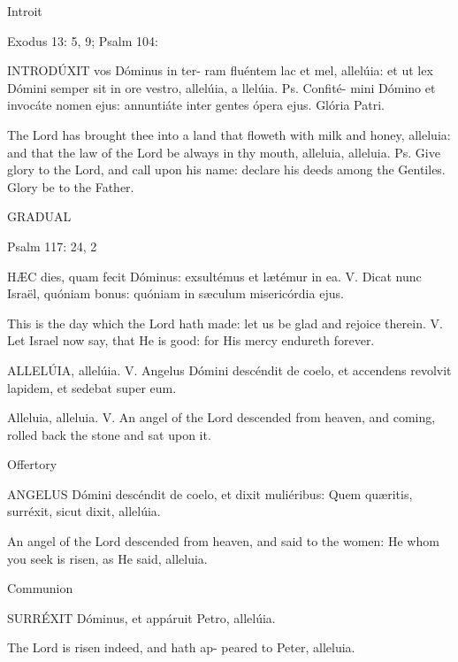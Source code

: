 
Introit

Exodus 13: 5, 9; Psalm 104: 

INTRODÚXIT vos  Dóminus  in  ter-
ram  fluéntem  lac  et  mel,  allelúia:  et  
ut  lex  Dómini  semper  sit  in  ore  
vestro,  allelúia,  a
llelúia.  Ps.  Confité-
mini  Dómino  et  invocáte  nomen  
ejus:  annuntiáte  inter  gentes  ópera  
ejus. Glória Patri. 

The Lord has brought thee into a land that 
floweth  with  milk  and  honey,  alleluia:  and  
that  the  law  of  the  Lord  be  always  in  thy  
mouth,  alleluia,  alleluia.  Ps.  Give  glory  to  
the  Lord,  and  call  upon  his  name:  declare  
his deeds among the Gentiles. Glory be to 
the Father. 



GRADUAL 

Psalm 117: 24, 2 

HÆC dies,   quam   fecit   Dóminus:   
exsultémus  et  lætémur  in  ea.  
V.  Dicat   nunc   Israël,   quóniam   bonus:   
quóniam   in   sæculum   misericórdia   
ejus. 

This is the day which the Lord hath made: 
let  us  be  glad  and  rejoice  therein.  V.  Let  
Israel  now  say,  that  He  is  good:  for  His  
mercy endureth forever. 

ALLELÚIA,  allelúia.  
V.  Angelus  Dómini  descéndit  de  coelo,  
et  accendens   revolvit   lapidem,   
et   sedebat super eum.
 
Alleluia,  alleluia.  V.  An  angel  of  the  Lord  
descended   from   heaven,   and   coming,   
rolled back the stone and sat upon it. 


Offertory

ANGELUS
 Dómini descéndit de coelo, et dixit muliéribus: 
Quem quæritis, surréxit, sicut dixit, allelúia. 

An  angel  of  the  Lord  descended  from  
heaven, and said to the women: He whom 
you seek is risen, as He said, alleluia.


Communion

SURRÉXIT Dóminus,   et   appáruit   
Petro, allelúia. 

The  Lord  is  risen  indeed,  and  hath  ap-
peared to Peter, alleluia. 
